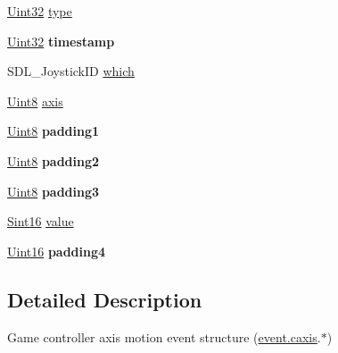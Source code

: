 \begin{DoxyCompactItemize}
\item 
\hyperlink{SDL__stdinc_8h_add440eff171ea5f55cb00c4a9ab8672d}{Uint32} \hyperlink{structSDL__ControllerAxisEvent_aa904b61e4763d28d887cf8afcc3cbb7c}{type}
\item 
\hypertarget{structSDL__ControllerAxisEvent_afc92dba0b4d1652a1ecf9e85606d1f14}{}\hyperlink{SDL__stdinc_8h_add440eff171ea5f55cb00c4a9ab8672d}{Uint32} {\bfseries timestamp}\label{structSDL__ControllerAxisEvent_afc92dba0b4d1652a1ecf9e85606d1f14}

\item 
S\+D\+L\+\_\+\+Joystick\+I\+D \hyperlink{structSDL__ControllerAxisEvent_a07087f68ea9d64b50047d65312ee7b94}{which}
\item 
\hyperlink{SDL__stdinc_8h_a2944638813a090aa23e62f4da842c3e2}{Uint8} \hyperlink{structSDL__ControllerAxisEvent_aba6543c143521aebce06a41a8cf79db0}{axis}
\item 
\hypertarget{structSDL__ControllerAxisEvent_af980495b1e24f9a868f2ccb25ce9629b}{}\hyperlink{SDL__stdinc_8h_a2944638813a090aa23e62f4da842c3e2}{Uint8} {\bfseries padding1}\label{structSDL__ControllerAxisEvent_af980495b1e24f9a868f2ccb25ce9629b}

\item 
\hypertarget{structSDL__ControllerAxisEvent_a4a04fcd20a54db21c5258ab0e40c6ab5}{}\hyperlink{SDL__stdinc_8h_a2944638813a090aa23e62f4da842c3e2}{Uint8} {\bfseries padding2}\label{structSDL__ControllerAxisEvent_a4a04fcd20a54db21c5258ab0e40c6ab5}

\item 
\hypertarget{structSDL__ControllerAxisEvent_ab82598fe5621dca9b1a41f7b2ca1e9a0}{}\hyperlink{SDL__stdinc_8h_a2944638813a090aa23e62f4da842c3e2}{Uint8} {\bfseries padding3}\label{structSDL__ControllerAxisEvent_ab82598fe5621dca9b1a41f7b2ca1e9a0}

\item 
\hyperlink{SDL__stdinc_8h_a9d0257032c0e146ab6121bf0122712f5}{Sint16} \hyperlink{structSDL__ControllerAxisEvent_a1ed7f14255ed01b982d40a38791d475a}{value}
\item 
\hypertarget{structSDL__ControllerAxisEvent_ae0ad0f279b9978bbbac9f5b22ae8020b}{}\hyperlink{SDL__stdinc_8h_a31fcc0a076c9068668173ee26d33e42b}{Uint16} {\bfseries padding4}\label{structSDL__ControllerAxisEvent_ae0ad0f279b9978bbbac9f5b22ae8020b}

\end{DoxyCompactItemize}


\subsection{Detailed Description}
Game controller axis motion event structure (\hyperlink{unionSDL__Event_aa8f6df0f2716fae56204b12ab4a4c289}{event.\+caxis}.$\ast$) 

